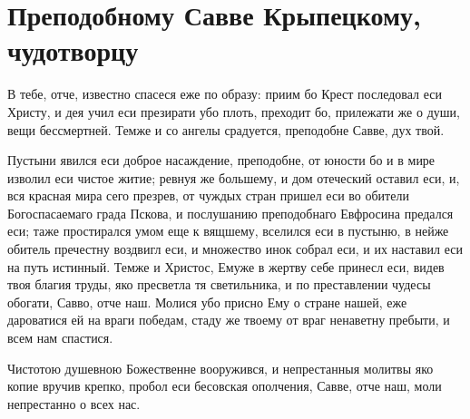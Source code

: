 
 

\section{Преподобному Савве Крыпецкому, чудотворцу}
 




В тебе, отче, известно спасеся еже по образу: приим бо Крест последовал еси Христу, и дея учил еси презирати убо плоть, преходит бо, прилежати же о души, вещи бессмертней. Темже и со ангелы срадуется, преподобне Савве, дух твой.




Пустыни явился еси доброе насаждение, преподобне, от юности бо и в мире изволил еси чистое житие; ревнуя же большему, и дом отеческий оставил еси, и, вся красная мира сего презрев, от чуждых стран пришел еси во обители Богоспасаемаго града Пскова, и послушанию преподобнаго Евфросина предался еси; таже простирался умом еще к вящшему, вселился еси в пустыню, в нейже обитель пречестну воздвигл еси, и множество инок собрал еси, и их наставил еси на путь истинный. Темже и Христос, Емуже в жертву себе принесл еси, видев твоя благия труды, яко пресветла тя светильника, и по преставлении чудесы обогати, Савво, отче наш. Молися убо присно Ему о стране нашей, еже дароватися ей на враги победам, стаду же твоему от враг ненаветну пребыти, и всем нам спастися.




Чистотою душевною Божественне вооружився, и непрестанныя молитвы яко копие вручив крепко, пробол еси бесовская ополчения, Савве, отче наш, моли непрестанно о всех нас.




